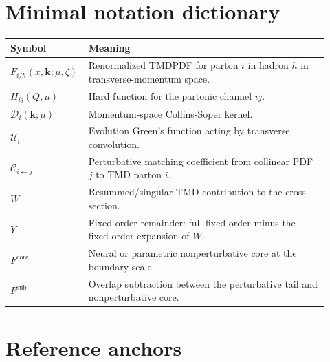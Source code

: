 \documentclass[11pt]{article}
\newcommand{\bk}{\bm{k}}
\newcommand{\core}{\mathrm{core}}
\newcommand{\sub}{\mathrm{sub}}
\begin{document}
\appendix
\appendix

\section{Minimal notation dictionary}

\begin{longtable}{>{\raggedright\arraybackslash}p{0.18\linewidth} p{0.74\linewidth}}
\toprule
Symbol & Meaning \\
\midrule
$F_{i/h}(x,\bk;\mu,\zeta)$ & Renormalized TMDPDF for parton $i$ in hadron $h$ in transverse-momentum space. \\
$H_{ij}(Q,\mu)$ & Hard function for the partonic channel $ij$. \\
$\mathcal D_i(\bk;\mu)$ & Momentum-space Collins-Soper kernel. \\
$\mathcal U_i$ & Evolution Green's function acting by transverse convolution. \\
$\mathcal C_{i\leftarrow j}$ & Perturbative matching coefficient from collinear PDF $j$ to TMD parton $i$. \\
$W$ & Resummed/singular TMD contribution to the cross section. \\
$Y$ & Fixed-order remainder: full fixed order minus the fixed-order expansion of $W$. \\
$F^{\core}$ & Neural or parametric nonperturbative core at the boundary scale. \\
$F^{\sub}$ & Overlap subtraction between the perturbative tail and nonperturbative core. \\
\bottomrule
\end{longtable}


\section{Reference anchors}
\end{document}
